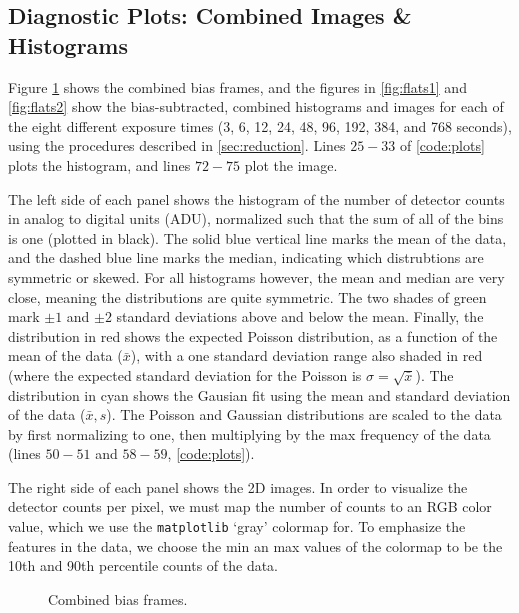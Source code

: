 \documentclass[preprint]{aastex62}
\begin{document}
\subsection{Diagnostic Plots: Combined Images \& Histograms} \label{subsec:diagnostic}
Figure \ref{fig:bias} shows the combined bias frames, and the figures in \ref{fig:flats1} and \ref{fig:flats2} show the bias-subtracted, combined histograms and images for each of the eight different exposure times (3, 6, 12, 24, 48, 96, 192, 384, and 768 seconds), using the procedures described in \ref{sec:reduction}. Lines $25-33$ of \ref{code:plots} plots the histogram, and lines $72-75$ plot the image.

The left side of each panel shows the histogram of the number of detector counts in analog to digital units (ADU), normalized such that the sum of all of the bins is one (plotted in black). The solid blue vertical line marks the mean of the data, and the dashed blue line marks the median, indicating which distrubtions are symmetric or skewed. For all histograms however, the mean and median are very close, meaning the distributions are quite symmetric. The two shades of green mark $\pm1$ and $\pm2$ standard deviations above and below the mean. Finally, the distribution in red shows the expected Poisson distribution, as a function of the mean of the data ($\bar{x}$), with a one standard deviation range also shaded in red (where the expected standard deviation for the Poisson is $\sigma=\sqrt{\bar{x}}$). The distribution in cyan shows the Gausian fit using the mean and standard deviation of the data ($\bar{x}, s$). The Poisson and Gaussian distributions are scaled to the data by first normalizing to one, then multiplying by the max frequency of the data (lines $50-51$ and $58-59$, \ref{code:plots}).

The right side of each panel shows the 2D images. In order to visualize the detector counts per pixel, we must map the number of counts to an RGB color value, which we use the {\tt matplotlib} `gray' colormap for. To emphasize the features in the data, we choose the min an max values of the colormap to be the 10th and 90th percentile counts of the data.

\begin{figure}[H]
\caption{Combined bias frames.} \label{fig:bias}
\end{figure}
\end{document}
